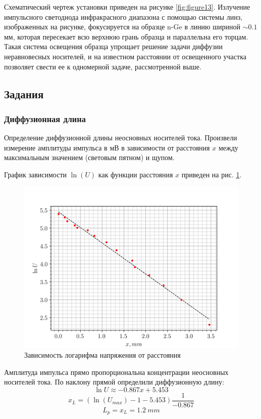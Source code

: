 Схематический чертеж установки приведен на рисунке \ref{fig:figure13}. Излучение импульсного светодиода инфракрасного диапазона с помощью системы линз, изображенных на рисунке, фокусируется на образце n-Ge в линию шириной $\sim0.1$ мм, которая пересекает всю верхнюю грань образца и параллельна его торцам. Такая система освещения образца упрощает решение задачи диффузии неравновесных носителей, и на известном расстоянии от освещенного участка позволяет свести ее к одномерной задаче, рассмотренной выше.

\subsection{Задания}
\subsubsection{Диффузионная длина}
Определение диффузионной длины неосновных носителей тока. Произвели измерение амплитуды импульса в мВ в зависимости от
расстояния $x$ между максимальным значением (световым пятном) и щупом.

График зависимости $\ln(U)$ как функции расстояния $x$ приведен на рис. \ref{fig:exp.1}.
\begin{figure}[H]
	\centering
	\includegraphics[]{graphs/task1.png}
	\caption{Зависимость логарифма напряжения от расстояния}
	\label{fig:exp.1}
\end{figure}
Амплитуда импульса прямо пропорциональна концентрации неосновных носителей тока. По наклону прямой определили диффузионную
длину:
$$\ln U \approx -0.867 x + 5.453$$
$$ x_L = (\ln(U_{max})-1-5.453)\frac{1}{-0.867} $$
$$L_p = x_L = 1.2 ~mm $$


